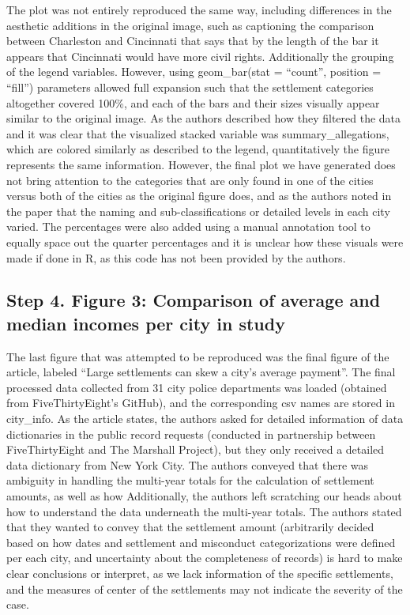 \documentclass[
  letterpaper,
  DIV=11,
  numbers=noendperiod]{scrartcl}
\begin{document}
The plot was not entirely reproduced the same way, including differences
in the aesthetic additions in the original image, such as captioning the
comparison between Charleston and Cincinnati that says that by the
length of the bar it appears that Cincinnati would have more civil
rights. Additionally the grouping of the legend variables. However,
using geom\_bar(stat = ``count'', position = ``fill'') parameters
allowed full expansion such that the settlement categories altogether
covered 100\%, and each of the bars and their sizes visually appear
similar to the original image. As the authors described how they
filtered the data and it was clear that the visualized stacked variable
was summary\_allegations, which are colored similarly as described to
the legend, quantitatively the figure represents the same information.
However, the final plot we have generated does not bring attention to
the categories that are only found in one of the cities versus both of
the cities as the original figure does, and as the authors noted in the
paper that the naming and sub-classifications or detailed levels in each
city varied. The percentages were also added using a manual annotation
tool to equally space out the quarter percentages and it is unclear how
these visuals were made if done in R, as this code has not been provided
by the authors.

\subsection{Step 4. Figure 3: Comparison of average and median incomes
per city in
study}\label{step-4.-figure-3-comparison-of-average-and-median-incomes-per-city-in-study}

The last figure that was attempted to be reproduced was the final figure
of the article, labeled ``Large settlements can skew a city's average
payment''. The final processed data collected from 31 city police
departments was loaded (obtained from FiveThirtyEight's GitHub), and the
corresponding csv names are stored in city\_info. As the article states,
the authors asked for detailed information of data dictionaries in the
public record requests (conducted in partnership between FiveThirtyEight
and The Marshall Project), but they only received a detailed data
dictionary from New York City. The authors conveyed that there was
ambiguity in handling the multi-year totals for the calculation of
settlement amounts, as well as how Additionally, the authors left
scratching our heads about how to understand the data underneath the
multi-year totals. The authors stated that they wanted to convey that
the settlement amount (arbitrarily decided based on how dates and
settlement and misconduct categorizations were defined per each city,
and uncertainty about the completeness of records) is hard to make clear
conclusions or interpret, as we lack information of the specific
settlements, and the measures of center of the settlements may not
indicate the severity of the case.
\end{document}
